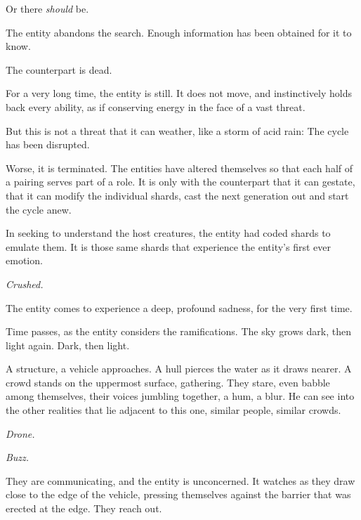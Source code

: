 Or there \emph{should} be.



The entity abandons the search.  Enough information has been obtained for it to know.



The counterpart is dead.



For a very long time, the entity is still.  It does not move, and instinctively holds back every ability, as if conserving energy in the face of a vast threat.



But this is not a threat that it can weather, like a storm of acid rain: The cycle has been disrupted.



Worse, it is terminated.  The entities have altered themselves so that each half of a pairing serves part of a role.  It is only with the counterpart that it can gestate, that it can modify the individual shards, cast the next generation out and start the cycle anew.



In seeking to understand the host creatures, the entity had coded shards to emulate them.  It is those same shards that experience the entity's first ever emotion.



\emph{Crushed.}



The entity comes to experience a deep, profound sadness, for the very first time.



Time passes, as the entity considers the ramifications.  The sky grows dark, then light again.  Dark, then light.



A structure, a vehicle approaches.  A hull pierces the water as it draws nearer.  A crowd stands on the uppermost surface, gathering.  They stare, even babble among themselves, their voices jumbling together, a hum, a blur.  He can see into the other realities that lie adjacent to this one, similar people, similar crowds.



\emph{Drone.}



\emph{Buzz.}



They are communicating, and the entity is unconcerned.  It watches as they draw close to the edge of the vehicle, pressing themselves against the barrier that was erected at the edge.  They reach out.



